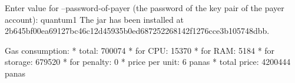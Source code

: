\begin{shellbox}\begin{ttlst}
Enter value for --password-of-payer (the password of the key pair of the payer account): quantum1
The jar has been installed at 2b645bf00ea69127bc46c12d45935b0ed687252268142f1276cce3b105748dbb.

Gas consumption:
 * total: 700074
   * for CPU: 15370
   * for RAM: 5184
   * for storage: 679520
   * for penalty: 0
 * price per unit: 6 panas
 * total price: 4200444 panas
\end{ttlst}\end{shellbox}
